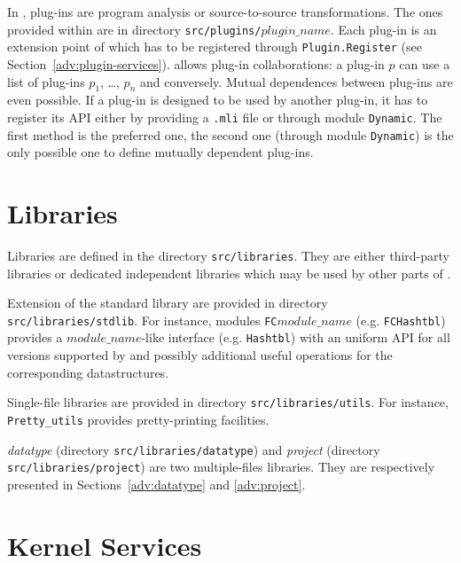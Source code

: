 In \framac, plug-ins are program analysis or source-to-source
transformations. The ones provided within \framac are in directory
\texttt{src/plugins/$plugin\_name$}. Each plug-in is an extension point of \framac which
has to be registered through \texttt{Plugin.Register}
(see Section~\ref{adv:plugin-services}). \framac allows plug-in collaborations:
a plug-in $p$ can use a list of plug-ins $p_1$, \dots, $p_n$ and
conversely. Mutual dependences between plug-ins are even possible. If a plug-in
is designed to be used by another plug-in, it has to register its API either by
providing a \texttt{.mli} file or through module
\texttt{Dynamic}. The first method
is the preferred one, the second one (through module \texttt{Dynamic}) is the
only possible one to define mutually dependent plug-ins.


\section{Libraries}\label{archi:libraries}

Libraries are defined in the directory \texttt{src/libraries}. They are either
third-party libraries or dedicated independent libraries which may be used by
other parts of \framac.

Extension of the \caml standard library are provided in directory
\texttt{src/libraries/stdlib}. For instance, modules \texttt{FC$module\_name$}
(e.g. \texttt{FCHashtbl}) provides a
\texttt{$module\_name$}-like interface (e.g. \texttt{Hashtbl}) with an uniform
API for all \ocaml versions supported by \framac and possibly additional useful
operations for the corresponding datastructures.

Single-file libraries are provided in directory
\texttt{src/libraries/utils}. For instance,
\texttt{Pretty\_utils} provides pretty-printing
facilities.

\emph{datatype} (directory \texttt{src/libraries/datatype}) and \emph{project}
(directory \texttt{src/libraries/project}) are two multiple-files
libraries. They are respectively presented in Sections~\ref{adv:datatype} and
\ref{adv:project}.


\section{Kernel Services}\label{archi:services}

